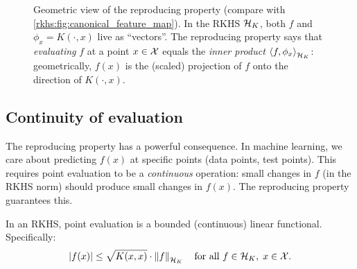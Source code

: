 \begin{notechapter}
\begin{figure}[ht]
\caption{Geometric view of the reproducing property
(compare with
\cref{rkhs:fig:canonical_feature_map}).
In the RKHS $\mathcal{H}_K$, both $f$ and
$\phi_x = K(\cdot, x)$ live as ``vectors''. The
reproducing property says that \emph{evaluating} $f$
at a point $x \in \mathcal{X}$ equals the \emph{inner product}
$\left\langle f, \phi_x \right\rangle_{\mathcal{H}_K}$: geometrically, $f(x)$ is
the (scaled\protect\footnotemark) projection of $f$
onto the direction of $K(\cdot, x)$.}
\label{rkhs:fig:reproducing_property}
\end{figure}

\subsection{Continuity of evaluation}

The reproducing property has a powerful consequence.
In machine learning, we care about predicting
$f(x)$ at specific points (data points, test points).
This requires point evaluation to be a
\emph{continuous} operation: small changes in $f$
(in the RKHS norm) should produce small changes in
$f(x)$. The reproducing property guarantees this.

\begin{proposition}
\label{rkhs:prop:eval_continuous}
In an RKHS, point evaluation is a bounded (continuous)
linear functional. Specifically:
\begin{equation}
\label{rkhs:eq:eval_bound}
|f(x)| \leq \sqrt{K(x,x)} \cdot \left\|f\right\|_{\mathcal{H}_K}
\quad \text{for all } f \in \mathcal{H}_K,\; x \in \mathcal{X}.
\end{equation}
\end{proposition}


\end{notechapter}
